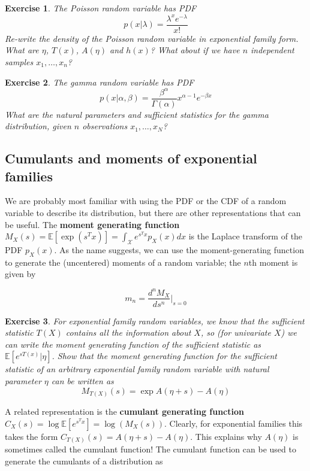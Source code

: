 \documentclass[twoside]{article}
\newcounter{lecnum}
\newtheorem{exercise}{Exercise}[lecnum]
\newcommand\E{\mathbb{E}}
\begin{document}
\begin{exercise}
  The Poisson random variable has PDF
  $$p(x|\lambda) = \frac{\lambda^xe^{-\lambda}}{x!}$$
  Re-write the density of the Poisson random variable in exponential family form. What are $\eta$, $T(x)$, $A(\eta)$ and $h(x)$? What about if we have $n$ independent samples $x_1,\dots, x_n$?
\end{exercise}

\begin{exercise}
  The gamma random variable has PDF
  $$p(x|\alpha,\beta) = \frac{\beta^\alpha}{\Gamma(\alpha)}x^{\alpha-1}e^{-\beta x}$$
  What are the natural parameters and sufficient statistics for the gamma distribution, given $n$ observations $x_1,\dots, x_N$?
\end{exercise}


\subsection{Cumulants and moments of exponential families}

We are probably most familiar with using the PDF or the CDF of a random variable to describe its distribution, but there are other representations that can be useful. The \textbf{moment generating function} $M_X(s) = \E[\exp(s^Tx)] = \int_\mathcal{X} e^{s^Tx}p_X(x) dx$ is the Laplace transform of the PDF $p_X(x)$. As the name suggests, we can use the moment-generating function to generate the (uncentered) moments of a random variable; the $n$th moment is given by

$$m_n = \frac{d^nM_X}{ds^n}\Bigr|_{s=0}$$

\begin{exercise}
  For exponential family random variables, we know that the sufficient statistic $T(X)$ contains all the information about $X$, so (for univariate $X$) we can write the moment generating function of the sufficient statistic as $\E[e^{sT(x)}|\eta]$. Show that the moment generating function for the sufficient statistic of  an arbitrary exponential family random variable with natural parameter $\eta$ can be written as
    $$M_{T(X)}(s) = \exp{A(\eta+s) - A(\eta)}$$
\end{exercise}

A related representation is the \textbf{cumulant generating function} $C_X(s) = \log \E[e^{s^Tx}] = \log(M_X(s))$. Clearly, for exponential families this takes the form $C_{T(X)}(s) = A(\eta+s)-A(\eta)$. This explains why $A(\eta)$ is sometimes called the cumulant function! The cumulant function can be used to generate the cumulants of a distribution as
\end{document}
